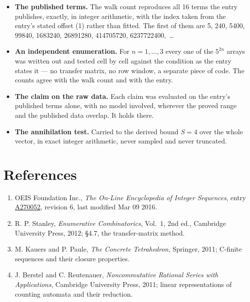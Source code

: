 \documentclass[11pt]{article}
\theoremstyle{definition}
\begin{document}
\begin{itemize}

\item {\bfseries The published terms.} The walk count reproduces all 16 terms the entry publishes, exactly, in integer arithmetic, with the index taken from the entry's stated offset (1) rather than fitted. The first of them are 5, 240, 5400, 99840, 1683240, 26891280, 414705720, 6237722400,~\dots

\item {\bfseries An independent enumeration.} For $n = 1,\dots,3$ every one of the $5^{2n}$ arrays was written out and tested cell by cell against the condition as the entry states it --- no transfer matrix, no row window, a separate piece of code. The counts agree with the walk count and with the entry.

\item {\bfseries The claim on the raw data.} Each claim was evaluated on the entry's published terms alone, with no model involved, wherever the proved range and the published data overlap. It holds there.

\item {\bfseries The annihilation test.} Carried to the derived bound $S = 4$ over the whole vector, in exact integer arithmetic, never sampled and never truncated.

\end{itemize}

\section{References}

\begin{enumerate}

\item OEIS Foundation Inc., \emph{The On-Line Encyclopedia of Integer Sequences}, entry \href{https://oeis.org/A270052}{A270052}, revision 6, last modified Mar 09 2016.

\item R. P. Stanley, \emph{Enumerative Combinatorics}, Vol.~1, 2nd ed., Cambridge University Press, 2012; \S4.7, the transfer-matrix method.

\item M. Kauers and P. Paule, \emph{The Concrete Tetrahedron}, Springer, 2011; C-finite sequences and their closure properties.

\item J. Berstel and C. Reutenauer, \emph{Noncommutative Rational Series with Applications}, Cambridge University Press, 2011; linear representations of counting automata and their reduction.

\end{enumerate}
\end{document}
